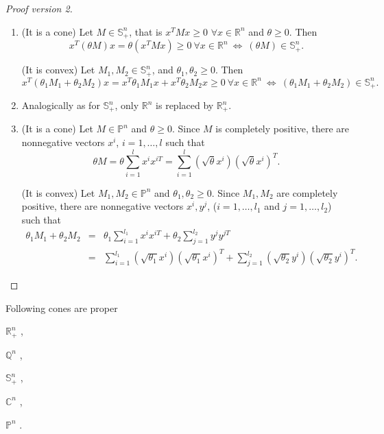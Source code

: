 \documentclass[12pt]{book}
\theoremstyle{definition}
\begin{document}
\begin{appendix}
\begin{proof}[Proof version 2]
\begin{enumerate}
\item (It is a cone) Let $M\in \mathbb{S}^n_+$, that is $x^TMx\geq 0$ $\forall x\in\mathbb{R}^n$ and $\theta \geq 0$. Then $$x^T(\theta M)x = \theta(x^TMx) \geq 0 \ \forall x\in\mathbb{R}^n \ \Leftrightarrow \ (\theta M) \in \mathbb{S}^n_+.$$

(It is convex)  Let $M_1, M_2\in \mathbb{S}^n_+$, and $\theta_1, \theta_2 \geq 0$. Then
$$x^T(\theta_1M_1 + \theta_2M_2)x = x^T\theta_1M_1x + x^T\theta_2M_2x \geq 0 \ \forall x\in\mathbb{R}^n \ \Leftrightarrow \ (\theta_1M_1 + \theta_2M_2) \in \mathbb{S}^n_+.$$

\item Analogically as for $\mathbb{S}^n_+$, only $\mathbb{R}^n$ is replaced by $\mathbb{R}^n_+$.

\item (It is a cone) Let $M\in \mathbb{P}^n$ and $\theta \geq 0$. Since $M$ is completely positive, there are nonnegative vectors $x^i$, $i = 1,\dots , l$ such that
$$ \theta M = \theta\sum_{i = 1}^l x^{i}x^{iT} = \sum_{i = 1}^l (\sqrt{\theta} x^{i})(\sqrt{\theta} x^{i})^T.$$

(It is convex) Let $M_1, M_2\in \mathbb{P}^n$ and $\theta_1, \theta_2 \geq 0$. Since $M_1, M_2$ are completely positive, there are nonnegative vectors $x^i, y^j$, ($i = 1,\dots , l_1$ and $j = 1,\dots ,l_2$)  such that
\begin{eqnarray*}
 \theta_1 M_1 + \theta_2 M_2 &=& \theta_1\sum_{i = 1}^{l_1} x^{i}x^{iT} + \theta_2\sum_{j = 1}^{l_2} y^{j}y^{jT} \\
 		& = & \sum_{i = 1}^{l_1} (\sqrt{\theta_1} x^{i})(\sqrt{\theta_1} x^{i})^T + \sum_{j = 1}^{l_2} (\sqrt{\theta_2} y^{i})(\sqrt{\theta_2} y^{i})^T .
\end{eqnarray*}
\end{enumerate}
\end{proof}

 Following cones are proper
\label{ExProperCones}

\begin{enumerate*}
\item $\mathbb{R}^n_+$ , \ \
\item $\mathbb{Q}^n$ , \ \
\item $\mathbb{S}^n_+$ , \ \ 
\item $\mathbb{C}^n$ , \ \ 
\item $\mathbb{P}^n$ . \ \ 
\end{enumerate*}


\end{appendix}
\end{document}
